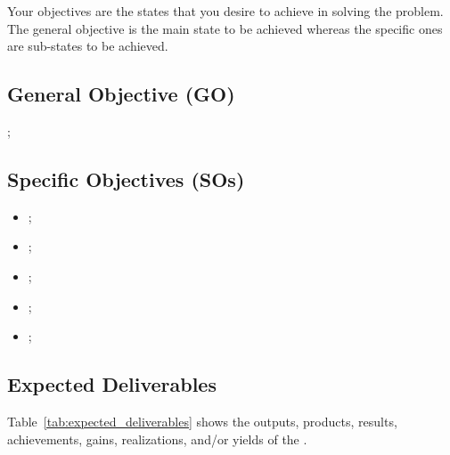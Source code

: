 Your objectives are the states that you desire to achieve in solving the problem. The general objective is the main state to be achieved whereas the specific ones are sub-states to be achieved.

\subsection{General Objective (GO)}
 ;

\subsection{Specific Objectives (SOs)}

\begin{itemize}
	\item {};
	
	\item {};
	
	\item {};
	
	\item {};
	
	\item {};
\end{itemize}



\subsection{Expected Deliverables}

Table~\ref{tab:expected_deliverables} shows the outputs, products, results, achievements, gains, realizations, and/or
yields of the \documentType. 


